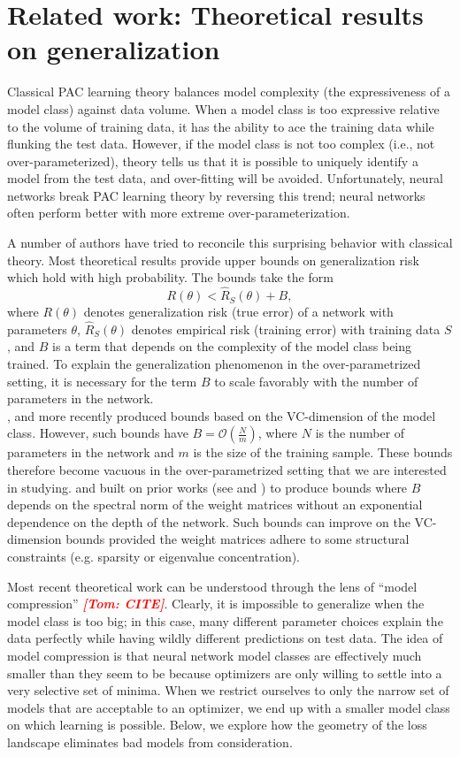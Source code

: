 \documentclass{article}
\newcommand{\tom}[1]{{  \textcolor{red}{\bf \em [Tom: #1]}}}
\begin{document}
    \section{Related work: Theoretical results on generalization}
Classical PAC learning theory balances model complexity (the expressiveness of a model class) against data volume.  When a model class is too expressive relative to the volume of training data, it has the ability to ace the training data while flunking the test data.   However, if the model class is not too complex (i.e., not over-parameterized), theory tells us that it is possible to uniquely identify a model from the test data, and over-fitting will be avoided.
%
Unfortunately, neural networks break PAC learning theory by reversing this trend; neural networks often perform better with more extreme over-parameterization.

A number of authors have tried to reconcile this surprising behavior with classical theory.   Most theoretical results provide upper bounds on generalization risk which hold with high probability. The bounds take the form
 $$R(\theta) < \hat{R}_S(\theta) + B,$$
 where $R(\theta)$ denotes generalization risk (true error) of a network with parameters $\theta$, $\hat{R}_S(\theta)$ denotes empirical risk (training error) with training data $S$, and $B$ is a term that depends on the complexity of the model class being trained. To explain the generalization phenomenon in the over-parametrized setting, it is necessary for the term $B$ to scale favorably with the number of parameters in the network.\\
    \cite{Bartlett1998}, and more recently \cite{Harvey2017} produced bounds based on the VC-dimension of the model class. However, such bounds have $B=\mathcal{O}(\frac{N}{m})$, where $N$ is the number of parameters in the network and $m$ is the size of the training sample. These bounds therefore become vacuous in the over-parametrized setting that we are interested in studying. \cite{Neyshabur2018} and \cite{Bartlett2017} built on prior works (see \cite{Bartlett2003} and \cite{Neyshabur2015}) to produce bounds where $B$ depends on the spectral norm of the weight matrices without an exponential dependence on the depth of the network. Such bounds can improve on the VC-dimension bounds provided the weight matrices adhere to some structural constraints (e.g. sparsity or eigenvalue concentration).

    Most recent theoretical work can be understood through the lens of  ``model compression'' \tom{CITE}.  Clearly, it is impossible to generalize when the model class is too big; in this case, many different parameter choices explain the data perfectly while having wildly different predictions on test data.  The idea of model compression is that neural network model classes are effectively much smaller than they seem to be because optimizers are only willing to settle into a very selective set of minima.  When we restrict ourselves to only the narrow set of models that are acceptable to an optimizer, we end up with a smaller model class on which learning is possible.  Below, we explore how the geometry of the loss landscape eliminates bad models from consideration.
\end{document}
